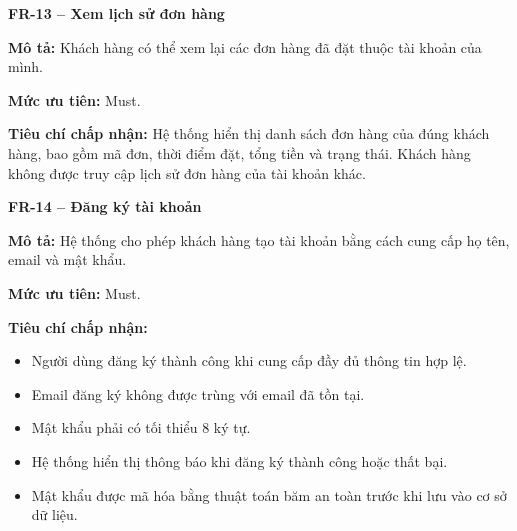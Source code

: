 \documentclass[a4paper]{article}
\begin{document}
\par\ifdim\dimexpr\pagegoal-\pagetotal\relax<6\baselineskip\newpage\fi
{}

\noindent\textbf{FR-13 – Xem lịch sử đơn hàng}\par\nopagebreak
\begin{list}{}{%
    \setlength{\leftmargin}{0.8cm}%
    \setlength{\rightmargin}{0pt}%
    \setlength{\labelwidth}{0pt}%
    \setlength{\labelsep}{0pt}%
    \setlength{\itemindent}{0pt}%
    \setlength{\listparindent}{0pt}%
    \setlength{\itemsep}{5pt}%
    \setlength{\parsep}{0pt}%
    \setlength{\topsep}{5pt}%
}
\item[] \textbf{Mô tả:} Khách hàng có thể xem lại các đơn hàng đã đặt thuộc tài khoản của mình.
\item[] \textbf{Mức ưu tiên:} Must.
\item[] \textbf{Tiêu chí chấp nhận:} Hệ thống hiển thị danh sách đơn hàng của đúng khách hàng, bao gồm mã đơn, thời điểm đặt, tổng tiền và trạng thái. Khách hàng không được truy cập lịch sử đơn hàng của tài khoản khác.
\end{list}

\par\ifdim\dimexpr\pagegoal-\pagetotal\relax<6\baselineskip\newpage\fi
{}

\noindent\textbf{FR-14 – Đăng ký tài khoản}\par\nopagebreak
\begin{list}{}{%
    \setlength{\leftmargin}{0.8cm}%
    \setlength{\rightmargin}{0pt}%
    \setlength{\labelwidth}{0pt}%
    \setlength{\labelsep}{0pt}%
    \setlength{\itemindent}{0pt}%
    \setlength{\listparindent}{0pt}%
    \setlength{\itemsep}{5pt}%
    \setlength{\parsep}{0pt}%
    \setlength{\topsep}{5pt}%
}
\item[] \textbf{Mô tả:} Hệ thống cho phép khách hàng tạo tài khoản bằng cách cung cấp họ tên, email và mật khẩu.
\item[] \textbf{Mức ưu tiên:} Must.
\item[] \textbf{Tiêu chí chấp nhận:} 
\begin{itemize}
\item Người dùng đăng ký thành công khi cung cấp đầy đủ thông tin hợp lệ.
\item Email đăng ký không được trùng với email đã tồn tại.
\item Mật khẩu phải có tối thiểu 8 ký tự.
\item Hệ thống hiển thị thông báo khi đăng ký thành công hoặc thất bại.
\item Mật khẩu được mã hóa bằng thuật toán băm an toàn trước khi lưu vào cơ sở dữ liệu.
\end{itemize}
\end{list}
\end{document}
